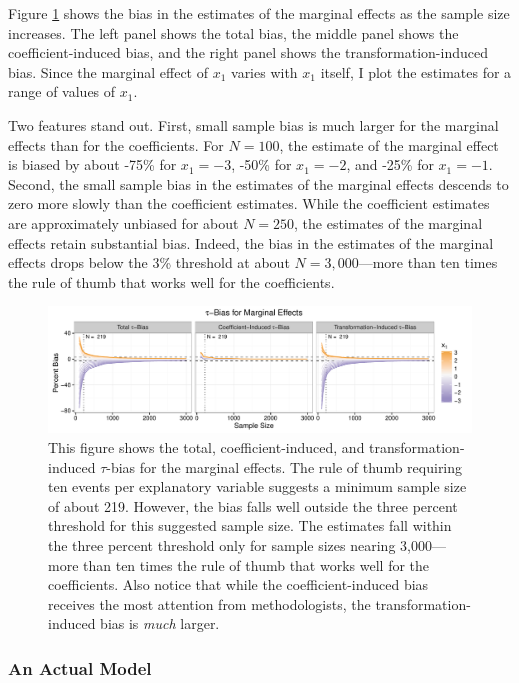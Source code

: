 \documentclass[12pt]{article}
\begin{document}
Figure \ref{fig:bias-me} shows the bias in the estimates of the marginal effects as the sample size increases. 
The left panel shows the total bias, the middle panel shows the coefficient-induced bias, and the right panel shows the transformation-induced bias.
Since the marginal effect of $x_1$ varies with $x_1$ itself, I plot the estimates for a range of values of $x_1$. 

Two features stand out. 
First, small sample bias is much larger for the marginal effects than for the coefficients. 
For $N = 100$, the estimate of the marginal effect is biased by about -75\% for $x_1 = -3$, -50\% for $x_1 = -2$, and -25\% for $x_1 = -1$. 
Second, the small sample bias in the estimates of the marginal effects descends to zero more slowly than the coefficient estimates.
While the coefficient estimates are approximately unbiased for about $N = 250$, the estimates of the marginal effects retain substantial bias. 
Indeed, the bias in the estimates of the marginal effects drops below the 3\% threshold at about $N = 3,000$---more than ten times the rule of thumb that works well for the coefficients. 

\begin{figure}[h!]
\begin{center}
\includegraphics[width = \textwidth]{figs/bias-me.pdf}
\caption{This figure shows the total, coefficient-induced, and transformation-induced $\tau$-bias for the marginal effects. The rule of thumb requiring ten events per explanatory variable suggests a minimum sample size of about 219. However, the bias falls well outside the three percent threshold for this suggested sample size. The estimates fall within the three percent threshold only for sample sizes nearing 3,000---more than ten times the rule of thumb that works well for the coefficients. Also notice that while the coefficient-induced bias receives the most attention from methodologists, the transformation-induced bias is \textit{much} larger.}\label{fig:bias-me}
\end{center}
\end{figure}

\subsubsection*{An Actual Model}
\end{document}
